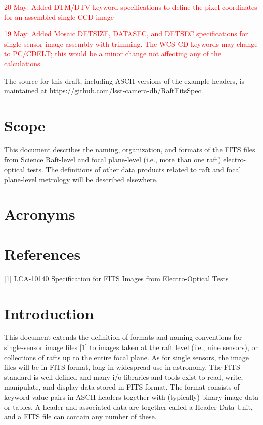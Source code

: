 \documentclass{article}[12pt]
\newcommand{\red}{\textcolor{red}}
\begin{document}
\red{20 May:  Added DTM/DTV keyword specifications to define the pixel coordinates for an assembled single-CCD image}

\red{19 May:  Added Mosaic DETSIZE, DATASEC, and DETSEC specifications for single-sensor image assembly with trimming.  The WCS CD keywords may change to PC/CDELT; this would be a minor change not affecting any of the calculations.}

The source for this draft, including ASCII versions of the example headers, is maintained at \url{https://github.com/lsst-camera-dh/RaftFitsSpec}.

\section{Scope}
This document describes the naming, organization, and formats of the FITS files from Science Raft-level and focal plane-level (i.e., more than one raft) electro-optical tests.  The definitions of other data products related to raft and focal plane-level metrology will be described elsewhere.

\section{Acronyms}

\section{References}

[1] LCA-10140 Specification for FITS Images from Electro-Optical Tests





\section{Introduction}
This document extends the definition of formats and naming conventions for single-sensor image files [1] to images taken at the raft level (i.e., nine sensors), or collections of rafts up to the entire focal plane.  As for single sensors, the image files will be in FlTS format, long in widespread use in astronomy.  The FITS standard is well defined and many i/o libraries and tools exist to read, write, manipulate, and display data stored in FITS format.  The format consists of keyword-value pairs in ASCII headers together with (typically) binary image data or tables.  A header and associated data are together called a Header Data Unit, and a FITS file can contain any number of these.
\end{document}
